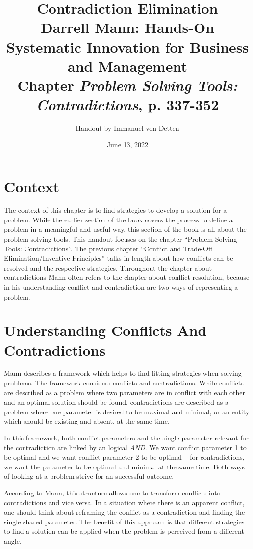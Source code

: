 \documentclass[11pt,a4paper]{article}
\title{Contradiction Elimination \\[1em] \large Darrell Mann: Hands-On
  Systematic Innovation for Business and Management \\ \large Chapter
  \textit{Problem Solving Tools: Contradictions}, p. 337-352}
\author{Handout by Immanuel von Detten}
\date{June 13, 2022}
\begin{document}
\maketitle

\section{Context}

The context of this chapter is to find strategies to develop a solution for a
problem. While the earlier section of the book covers the process to define a
problem in a meaningful and useful way, this section of the book is all about
the problem solving tools. This handout focuses on the chapter
\enquote{Problem Solving Tools: Contradictions}. The previous chapter
\enquote{Conflict and Trade-Off Elimination/Inventive Principles} talks in
length about how conflicts can be resolved and the respective strategies.
Throughout the chapter about contradictions Mann often refers to the chapter
about conflict resolution, because in his understanding conflict and
contradiction are two ways of representing a problem.

\section{Understanding Conflicts And Contradictions}

Mann describes a framework which helps to find fitting strategies when solving
problems. The framework considers conflicts and contradictions. While
conflicts are described as a problem where two parameters are in conflict with
each other and an optimal solution should be found, contradictions are
described as a problem where one parameter is desired to be maximal and
minimal, or an entity which should be existing and absent, at the same time.

In this framework, both conflict parameters and the single parameter relevant
for the contradiction are linked by an logical \emph{AND}. We want conflict
parameter 1 to be optimal and we want conflict parameter 2 to be optimal --
for contradictions, we want the parameter to be optimal and minimal at the
same time. Both ways of looking at a problem strive for an successful outcome.

According to Mann, this structure allows one to transform conflicts into
contradictions and vice versa. In a situation where there is an apparent
conflict, one should think about reframing the conflict as a contradiction and
finding the single shared parameter. The benefit of this approach is that
different strategies to find a solution can be applied when the problem is
perceived from a different angle.
\end{document}

